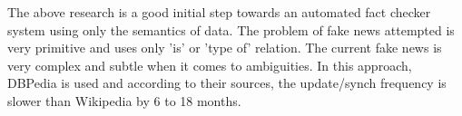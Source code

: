 \documentclass[a4paper, 11pt]{article}
\begin{document}
The above research is a good initial step towards an automated fact checker system using only the semantics of data. The problem of fake news attempted is very primitive and uses only 'is' or 'type of' relation. The current fake news is very complex and subtle when it comes to ambiguities. In this approach, DBPedia is used and according to their sources, the update/synch frequency is slower than Wikipedia by 6 to 18 months.







  




\end{document}
